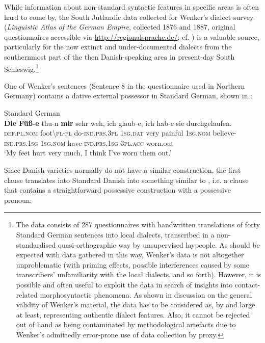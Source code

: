 \documentclass[output=paper]{langsci/langscibook}
\begin{document}
While information about non-standard syntactic features in specific areas is often hard to come by, the South Jutlandic data collected for Wenker’s dialect survey (\textit{Linguistic Atlas of the German Empire}, collected 1876 and 1887, original questionnaires accessible via \url{http://regionalsprache.de/}; cf. \citealt{Fleischer.2017}) is a valuable source, particularly for the now extinct and under-documented dialects from the southernmost part of the then Danish-speaking area in present-day South Schleswig.\footnote{The data consists of 287 questionnaires with handwritten translations of forty Standard German sentences into local dialects, transcribed in a non-standardised quasi-orthographic way by unsupervised laypeople. As should be expected with data gathered in this way, Wenker’s data is not altogether unproblematic (with priming effects, possible interferences caused by some transcribers’ unfamiliarity with the local dialects, and so forth). However, it is possible and often useful to exploit the data in search of insights into contact-related morphosyntactic phenomena. As shown in  discussion on the general validity of Wenker’s material, the data has to be considered as, by and large at least, representing authentic dialect features. Also, it cannot be rejected out of hand as being contaminated by methodological artefacts due to Wenker’s admittedly error-prone use of data collection by proxy.}

One of Wenker’s sentences (Sentence 8 in the questionnaire used in Northern Germany) contains a dative external possessor in Standard German, shown in :

\ea\label{ex:hoeder:22}
	Standard German\\
	\gll \textbf{Die} \textbf{Füß-e}{} thu-n \textbf{mir} sehr weh, ich glaub-e, ich hab-e sie durchgelaufen.\\
     \textsc{def.pl.nom} foot{\textbackslash}\textsc{pl-pl} do-\textsc{ind.prs.3pl} \textsc{1sg.dat} very painful 1\textsc{sg.nom} believe-\textsc{ind.prs.1sg} \textsc{1sg.nom} have-\textsc{ind.prs.1sg} \textsc{3pl.acc} worn.out\\
	\glt `My feet hurt very much, I think I’ve worn them out.'
\z

Since Danish varieties normally do not have a similar construction, the first clause translates into Standard Danish into something similar to , i.e. a clause that contains a straightforward possessive construction with a possessive pronoun:
\end{document}

